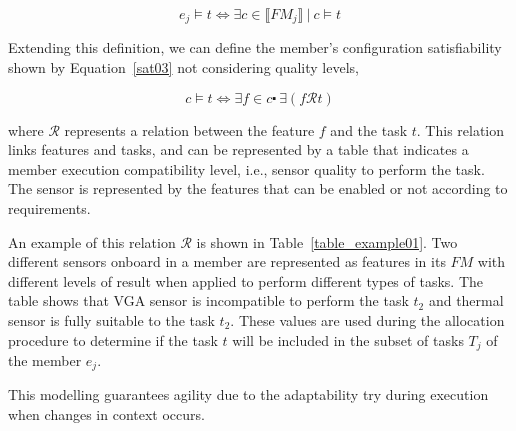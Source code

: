 \begin{center}
\begin{equation}
\label{sat02}
e_j \models t \Longleftrightarrow \exists c \in \llbracket FM_j \rrbracket \ | \ c \models t
\end{equation}
\end{center}

Extending this definition, we can define the member's configuration satisfiability shown by Equation~\ref{sat03} not considering quality levels,

\begin{center}
\begin{equation}
\label{sat03}
c \models t \Longleftrightarrow \exists f \in c \centerdot \ \exists (f \mathcal{R} t)
\end{equation}
\end{center}

where $\mathcal{R}$ represents a relation between the feature $f$ and the task $t$. This relation links features and tasks, and can be represented by a table that indicates a member execution compatibility level, i.e., sensor quality to perform the task. The sensor is represented by the features that can be enabled or not according to requirements.

An example of this relation $\mathcal{R}$ is shown in Table~\ref{table_example01}. Two different sensors onboard in a member are represented as features in its $FM$ with different levels of result when applied to perform different types of tasks. The table shows that VGA sensor is incompatible to perform the task $t_2$ and thermal sensor is fully suitable to the task $t_2$. These values are used during the allocation procedure to determine if the task $t$ will be included in the subset of tasks $T_j$ of the member $e_j$.



This modelling guarantees agility due to the adaptability try during execution when changes in context occurs.






